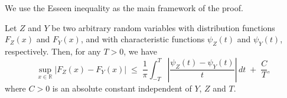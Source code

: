 We use the Esseen inequality \cite{korolev2012improvement, korolev2010upper} as the main framework of the proof.
\begin{lemma}
Let $Z$ and $Y$ be two arbitrary random variables with distribution functions $F_{Z}(x)$ and $F_{Y}(x)$, and with characteristic functions
$\psi_Z(t)$ and $\psi_Y(t)$, respectively. Then, for any $T>0$, we have
\[
\sup_{x\in\mathbb{R}} |F_{Z}(x)-F_{Y}(x)| 
\;\leq\; \frac{1}{\pi}\int_{-T}^{T} 
\left| \frac{\psi_Z(t)-\psi_Y(t)}{t} \right| \, dt \;+\; \frac{C}{T},
\]
where $C>0$ is an absolute constant independent of $Y$, $Z$ and $T$.
\end{lemma}

